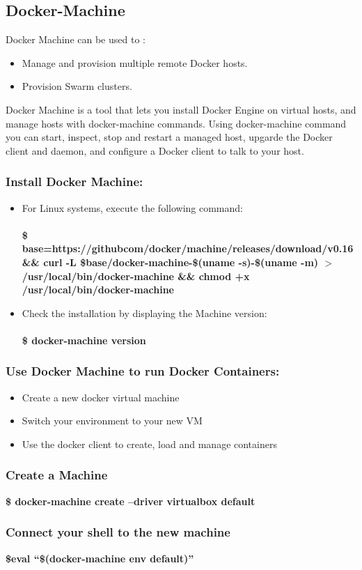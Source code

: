 \documentclass[12pt]{article}
\begin{document}
\subsection{Docker-Machine}
Docker Machine can be used to :
\begin{itemize}
	\item Manage and provision multiple remote Docker hosts.
	\item Provision Swarm clusters.
\end{itemize}
Docker Machine is a tool that lets you install Docker Engine on virtual hosts, and manage hosts with docker-machine commands. Using docker-machine command you can start, inspect, stop and restart a managed host, upgarde the Docker client and daemon, and configure a Docker client to talk to your host.
\subsubsection{Install Docker Machine:}
\begin{itemize}
	\item For Linux systems, execute the following command:\\\\
	\textbf{\$ base=https://githubcom/docker/machine/releases/download/v0.16 \&\& curl -L \$base/docker-machine-\$(uname -s)-\$(uname -m) $>$/usr/local/bin/docker-machine \&\& chmod +x /usr/local/bin/docker-machine}
	\item Check the installation by displaying the Machine version:\\\\
	\textbf{\$ docker-machine version}
\end{itemize}
\subsubsection{Use Docker Machine to run Docker Containers:}
\begin{itemize}
	\item Create a new docker virtual machine
	\item Switch your environment to your new VM
	\item Use the docker client to create, load and manage containers
\end{itemize}
\subsubsection{Create a Machine}
\textbf{\$ docker-machine create --driver virtualbox default}
\subsubsection{Connect your shell to the new machine}
\textbf{\$eval “\$(docker-machine env default)”}
\end{document}
